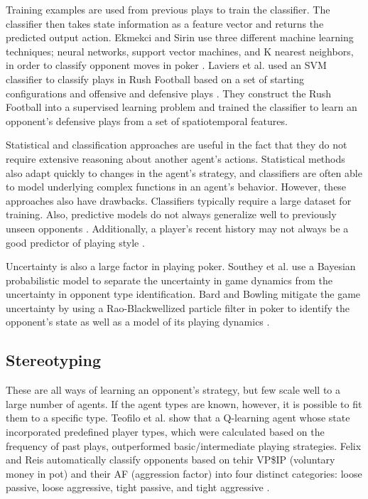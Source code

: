 \documentclass{aamas2014}
\begin{document}
Training examples are used from previous plays to train the classifier. The classifier then takes state information as a feature vector and returns the predicted output action. Ekmekci and Sirin use three different machine learning techniques; neural networks, support vector machines, and K nearest neighbors, in order to classify opponent moves in poker \cite{Ekmekci}. Laviers et al. used an SVM classifier to classify plays in Rush Football based on a set of starting configurations and offensive and defensive plays \cite{Laviers}. They construct the Rush Football into a supervised learning problem and trained the classifier to learn an opponent's defensive plays from a set of spatiotemporal features.

Statistical and classification approaches are useful in the fact that they do not require extensive reasoning about another agent's actions. Statistical methods also adapt quickly to changes in the agent's strategy, and classifiers are often able to model underlying complex functions in an agent's behavior. However, these approaches also have drawbacks. Classifiers typically require a large dataset for training. Also, predictive models do not always generalize well to previously unseen opponents \cite{predictivemodels}. Additionally, a player's recent history may not always be a good predictor of playing style \cite{playingstyle}.

Uncertainty is also a large factor in playing poker. Southey et al. use a Bayesian probabilistic model to separate the uncertainty in game dynamics from the uncertainty in opponent type identification. Bard and Bowling mitigate the game uncertainty by using a Rao-Blackwellized particle filter in poker to identify the opponent's state as well as a model of its playing dynamics \cite{Southey,Bard}.


\subsection{Stereotyping}
\label{sec:stereotyping}

These are all ways of learning an opponent's strategy, but few scale well to a large number of agents. If the agent types are known, however, it is possible to fit them to a specific type. Teofilo et al. show that a Q-learning agent whose state incorporated predefined player types, which were calculated based on the frequency of past plays, outperformed basic/intermediate playing strategies. Felix and Reis automatically classify opponents based on tehir VP\$IP (voluntary money in pot) and their AF (aggression factor) into four distinct categories: loose passive, loose aggressive, tight passive, and tight aggressive \cite{Teofilo}.
\end{document}
